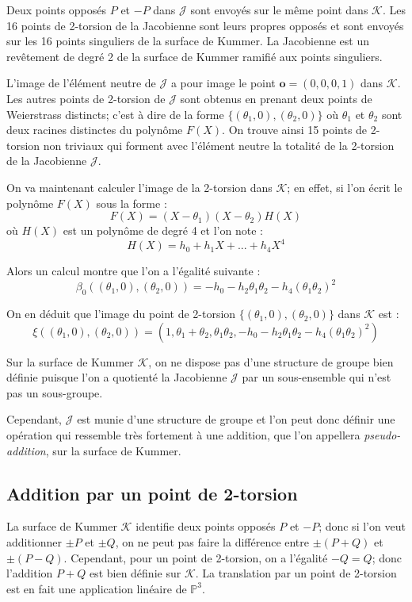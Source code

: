 \documentclass[a4paper,12pt]{article}
\theoremstyle{definition}
\theoremstyle{remark}
\numberwithin{equation}{section}
\begin{document}
Deux points opposés $P$ et $-P$ dans $\mathcal{J}$ sont envoyés sur le même point dans $\mathcal{K}$. Les 16 points de 2-torsion de la Jacobienne sont leurs propres opposés et sont envoyés sur les 16 points singuliers de la surface de Kummer. La Jacobienne est un revêtement de degré 2 de la surface de Kummer ramifié aux points singuliers.

L'image de l'élément neutre de $\mathcal{J}$ a pour image le point $\mathbf{o} = (0,0,0,1)$ dans $\mathcal{K}$. Les autres points de 2-torsion de $\mathcal{J}$ sont obtenus en prenant deux points de Weierstrass distincts; c'est à dire de la forme $\{(\theta_1,0),(\theta_2,0)\}$ où $\theta_1$ et $\theta_2$ sont deux racines distinctes du polynôme $F(X)$. On trouve ainsi 15 points de 2-torsion non triviaux qui forment avec l'élément neutre la totalité de la 2-torsion de la Jacobienne $\mathcal{J}$.

On va maintenant calculer l'image de la 2-torsion dans $\mathcal{K}$; en effet, si l'on écrit le polynôme $F(X)$ sous la forme :
$$F(X) = (X-\theta_1)(X-\theta_2)H(X)$$
où $H(X)$ est un polynôme de degré 4 et l'on note :
$$H(X) = h_0 + h_1X + ... + h_4X^4$$

Alors un calcul montre que l'on a l'égalité suivante :
$$\beta_0((\theta_1,0),(\theta_2,0)) = -h_0 -h_2\theta_1\theta_2 - h_4(\theta_1\theta_2)^2$$

On en déduit que l'image du point de 2-torsion $\{(\theta_1,0),(\theta_2,0)\}$ dans $\mathcal{K}$ est :
$$\xi((\theta_1,0),(\theta_2,0)) = (1,\theta_1+\theta_2,\theta_1\theta_2, -h_0 -h_2\theta_1\theta_2 - h_4(\theta_1\theta_2)^2)$$

Sur la surface de Kummer $\mathcal{K}$, on ne dispose pas d'une structure de groupe bien définie puisque l'on a quotienté la Jacobienne $\mathcal{J}$ par un sous-ensemble qui n'est pas un sous-groupe.

Cependant, $\mathcal{J}$ est munie d'une structure de groupe et l'on peut donc définir une opération qui ressemble très fortement à une addition, que l'on appellera \emph{pseudo-addition}, sur la surface de Kummer.

\subsection{Addition par un point de 2-torsion}
\label{add2tors}
La surface de Kummer $\mathcal{K}$ identifie deux points opposés $P$ et $-P$; donc si l'on veut additionner $\pm P$ et $\pm Q$, on ne peut pas faire la différence entre $\pm (P+Q)$ et $\pm (P-Q)$. Cependant, pour un point de 2-torsion, on a l'égalité $-Q=Q$; donc l'addition $P+Q$ est bien définie sur $\mathcal{K}$. La translation par un point de 2-torsion est en fait une application linéaire de $\mathbb{P}^3$.
\end{document}

